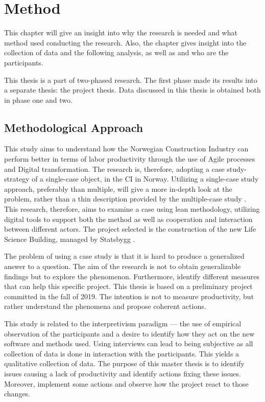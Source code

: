 
\chapter{Method} \label{chp:method}
This chapter will give an insight into why the research is needed and what method used conducting the research. Also, the chapter gives insight into the collection of data and the following analysis, as well as and who are the participants. 

This thesis is a part of two-phased research. The first phase made its results into a separate thesis: the project thesis. Data discussed in this thesis is obtained both in phase one and two. 

\section{Methodological Approach} \label{sec:purpose}
This study aims to understand how the Norwegian Construction Industry can perform better in terms of labor productivity through the use of Agile processes and Digital transformation. The research is, therefore, adopting a case study-strategy of a single-case object, in the CI in Norway. Utilizing a single-case study approach, preferably than multiple, will give a more in-depth look at the problem, rather than a thin description provided by the multiple-case study \citep{yin1993case}. This research, therefore, aims to examine a case using lean methodology, utilizing digital tools to support both the method as well as cooperation and interaction between different actors. The project selected is the construction of the new Life Science Building, managed by Statsbygg \citep{statsbygg2019uio}.   

The problem of using a case study is that it is hard to produce a generalized answer to a question. The aim of the research is not to obtain generalizable findings but to explore the phenomenon. Furthermore, identify different measures that can help this specific project. This thesis is based on a preliminary project committed in the fall of 2019. The intention is not to measure productivity, but rather understand the phenomena and propose coherent actions.

This study is related to the interpretivism paradigm — the use of empirical observation of the participants and a desire to identify how they act on the new software and methods used. Using interviews can lead to being subjective as all collection of data is done in interaction with the participants. This yields a qualitative collection of data. The purpose of this master thesis is to identify issues causing a lack of productivity and identify actions fixing these issues. Moreover, implement some actions and observe how the project react to those changes. 

